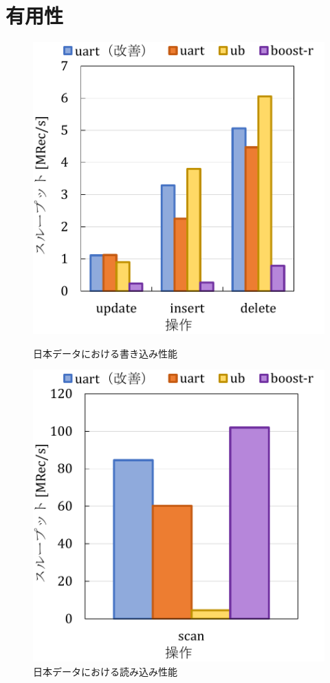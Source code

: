\section{有用性}

\begin{figure}[tb]
  \begin{minipage}[c]{0.495\textwidth}
    \centering
    \includegraphics[scale=0.5]{./figures/graph-japan-write.pdf}
    \caption{日本データにおける書き込み性能}
    \label{fig:japan}
  \end{minipage}
  \begin{minipage}[c]{0.495\textwidth}
    \centering
    \includegraphics[scale=0.5]{./figures/graph-japan-read.pdf}
    \caption{日本データにおける読み込み性能}
    \label{fig:japan}
  \end{minipage}
\end{figure}

